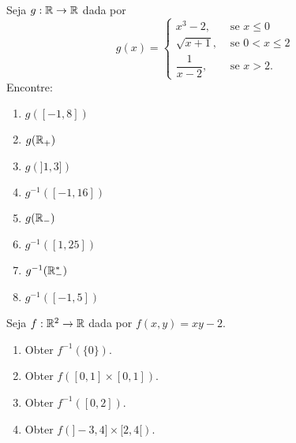 \documentclass[12pt]{exam}
\begin{document}
    \vspace{.3cm}

    \questao{} Seja $g : \mathbb{R} \to \mathbb{R}$ dada por
    \[
        g(x) = \begin{cases}
            x^3 - 2,& \mbox{ se } x \le 0\\
            \sqrt{x + 1}, & \mbox{ se } 0 < x \le 2\\
            \dfrac{1}{x - 2}, & \mbox{ se } x > 2.
        \end{cases}
    \]
    Encontre:
    \begin{multicols}{2}
        \begin{enumerate}[label={\alph*})]
            \item $g([-1,8])$

            \item $g(\mathbb{R}_+)$

            \item $g(]1, 3])$

            \item $g^{-1}([-1,16])$

            \item $g(\mathbb{R}_-)$

            \item $g^{-1}([1,25])$

            \item $g^{-1}(\mathbb{R}^*_-)$

            \item $g^{-1}([-1,5])$
        \end{enumerate}
    \end{multicols}

    \vspace{.3cm}

    \questao{} Seja $f: \mathbb{R}^2 \to \mathbb{R}$ dada por $f(x,y) = xy - 2$.
    \begin{multicols}{2}
        \begin{enumerate}[label={\alph*})]
            \item Obter $f^{-1}(\{0\})$.

            \item Obter $f([0,1]\times [0,1])$.

            \item Obter $f^{-1}([0,2])$.

            \item Obter $f(]-3,4]\times [2,4[)$.
        \end{enumerate}
    \end{multicols}
\end{document}
